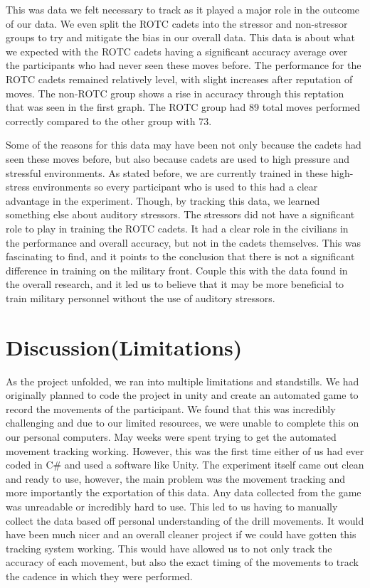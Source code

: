 \documentclass[manuscript,screen,review]{acmart}
\begin{document}
This was data we felt necessary to track as it played a major role in the outcome of our data. We even split the 
ROTC cadets into the stressor and non-stressor groups to try and mitigate the bias in our overall data. This data 
is about what we expected with the ROTC cadets having a significant accuracy average over the participants who had 
never seen these moves before. The performance for the ROTC cadets remained relatively level, with slight increases 
after reputation of moves. The non-ROTC group shows a rise in accuracy through this reptation that was seen in 
the first graph. The ROTC group had 89 total moves performed correctly compared to the other group with 73.   

Some of the reasons for this data may have been not only because the cadets had seen these moves before, but 
also because cadets are used to high pressure and stressful environments. As stated before, we are currently 
trained in these high-stress environments so every participant who is used to this had a clear advantage in the 
experiment. Though, by tracking this data, we learned something else about auditory stressors. The stressors 
did not have a significant role to play in training the ROTC cadets. It had a clear role in the civilians in 
the performance and overall accuracy, but not in the cadets themselves. This was fascinating to find, and it 
points to the conclusion that there is not a significant difference in training on the military front. Couple 
this with the data found in the overall research, and it led us to believe that it may be more beneficial to 
train military personnel without the use of auditory stressors.

\section{Discussion(Limitations)}
As the project unfolded, we ran into multiple limitations and standstills. We had originally planned to code 
the project in unity and create an automated game to record the movements of the participant. We found that 
this was incredibly challenging and due to our limited resources, we were unable to complete this on our 
personal computers. May weeks were spent trying to get the automated movement tracking working. However, 
this was the first time either of us had ever coded in C\# and used a software like Unity. 
The experiment itself came out clean and ready to use, however, the main problem was the movement tracking and more 
importantly the exportation of this data. Any data collected from the game was unreadable or incredibly 
hard to use. This led to us having to manually collect the data based off personal understanding of the 
drill movements. It would have been much nicer and an overall cleaner project if we could have gotten 
this tracking system working. This would have allowed us to not only track the accuracy of each movement, 
but also the exact timing of the movements to track the cadence in which they were performed.  
\end{document}
